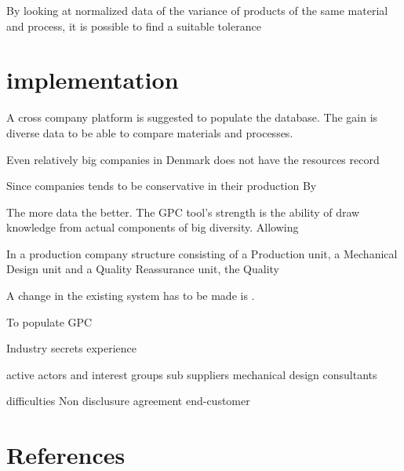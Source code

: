 \documentclass[aip,amsmath, reprint, author-year]{revtex4-1}
\begin{document}
By looking at normalized data of the variance of products of the same material and process, it is possible to find a suitable tolerance

\section{implementation}





A cross company platform is suggested to populate the database. The gain is diverse data to be able to compare materials and processes. 

Even relatively big companies in Denmark does not have the resources record 

Since companies tends to be conservative in their production 
By 

The more data the better. The GPC tool's strength is the ability of draw knowledge from actual components of big diversity. Allowing  

In a production company structure consisting of a Production unit, a Mechanical Design unit and a Quality Reassurance unit, the Quality 

A change in the existing system has to be made is .
 



To populate GPC 

Industry secrets
	experience
	
	
active actors and interest groups
	sub suppliers 
	mechanical design consultants
	

difficulties
	Non disclusure agreement
	end-customer
	

\section*{References}

\end{document}
